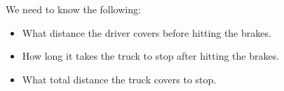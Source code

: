 {\begin{mdframed}[linewidth=4, leftmargin=40, rightmargin=40]
\begin{exercise}
\begin{enumerate}[noitemsep, label=\textbf{Step} \textbf{\arabic*}. ]
\begin{figure}[H]
\begin{center}
      \vspace{2pt}
    \vspace{.1in}
    
    \end{center}

 \end{figure}   

    \addtocounter{footnote}{-0}
    
      \par 
      \label{m38796*id79968}We need to know the following:\par 
      \label{m38796*id79972}\begin{itemize}[noitemsep]
            \leftskip=20pt\rightskip=\leftskip\label{m38796*uid151}\item What distance the driver covers before hitting the brakes.
\label{m38796*uid152}\item How long it takes the truck to stop after hitting the brakes.
\label{m38796*uid153}\item What total distance the truck covers to stop.
\end{itemize}
        

\end{enumerate}
\end{exercise}
\end{mdframed}}
